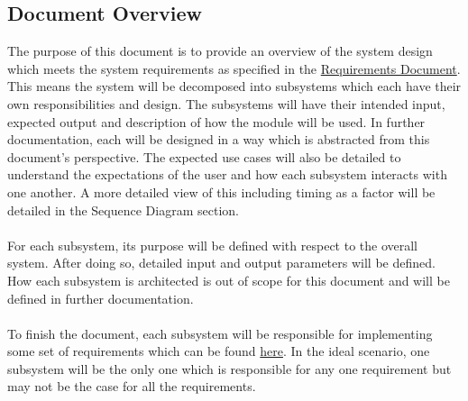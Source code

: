 \documentclass[11pt]{article}
\begin{document}
\subsection{Document Overview}
The purpose of this document is to provide an overview of the system design which meets the system requirements as specified in the \href{run:../Requirements/Requirements.pdf}{Requirements Document}. This means the system will be decomposed into subsystems which each have their own responsibilities and design. The subsystems will have their intended input, expected output and description of how the module will be used. In further documentation, each will be designed in a way which is abstracted from this document's perspective. The expected use cases will also be detailed to understand the expectations of the user and how each subsystem interacts with one another. A more detailed view of this including timing as a factor will be detailed in the Sequence Diagram section. \\ \\ %
For each subsystem, its purpose will be defined with respect to the overall system. After doing so, detailed input and output parameters will be defined. How each subsystem is architected is out of scope for this document and will be defined in further documentation. \\ \\
To finish the document, each subsystem will be responsible for implementing some set of requirements which can be found \href{run:../Requirements/Requirements.pdf}{here}.
In the ideal scenario, one subsystem will be the only one which is responsible for any one requirement but may not be the case for all the requirements.
\end{document}
